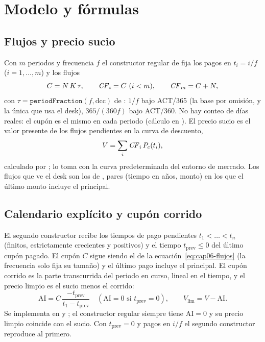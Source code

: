 \section{Modelo y fórmulas}\label{sec:cap06-modelo}

\subsection{Flujos y precio sucio}\label{sec:cap06-flujos}

Con $m$ periodos y frecuencia $f$ el constructor regular de 
fija los pagos en $t_i=i/f$ ($i=1,\dots,m$) y los flujos
\begin{equation}\label{eq:cap06-flujos}
  C=N\,K\,\tau,\qquad \mathit{CF}_i=C\ (i<m),\qquad \mathit{CF}_m=C+N,
\end{equation}
con $\tau=\texttt{periodFraction}(f,\mathrm{dcc})$ de : $1/f$ bajo
ACT/365 (la base por omisión, y la única que usa el desk), $365/(360f)$ bajo ACT/360. No hay conteo de días
reales: el cupón es el mismo en cada periodo (cálculo en ).
El precio sucio es el valor presente de los flujos pendientes en la curva de descuento,
\begin{equation}\label{eq:cap06-precio}
  V=\sum_{i}\mathit{CF}_i\,P_{c}(t_i),
\end{equation}
calculado por ; 
lo toma con la curva predeterminada del entorno de mercado. Los flujos que ve el desk son los de
, pares (tiempo en años, monto) en los que el último
monto incluye el principal.

\subsection{Calendario explícito y cupón corrido}\label{sec:cap06-corrido}

El segundo constructor recibe los tiempos de pago pendientes $t_1<\dots<t_n$ (finitos, estrictamente
crecientes y positivos) y el tiempo $t_{\mathrm{prev}}\le0$ del último cupón pagado. El cupón $C$ sigue
siendo el de la ecuación~\eqref{eq:cap06-flujos} (la frecuencia solo fija su tamaño) y el último pago incluye el
principal. El cupón corrido es la parte transcurrida del periodo en curso, lineal en el tiempo, y el precio
limpio es el sucio menos el corrido:
\begin{equation}\label{eq:cap06-corrido}
  \mathrm{AI}=C\,\frac{-t_{\mathrm{prev}}}{t_1-t_{\mathrm{prev}}}\quad(\mathrm{AI}=0\text{ si }t_{\mathrm{prev}}=0),
  \qquad V_{\mathrm{lim}}=V-\mathrm{AI}.
\end{equation}
Se implementa en  y
; el constructor regular siempre tiene $\mathrm{AI}=0$ y
su precio limpio coincide con el sucio. Con $t_{\mathrm{prev}}=0$ y pagos en $i/f$ el segundo constructor
reproduce al primero.

